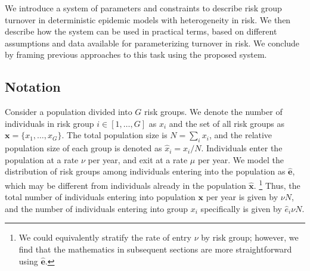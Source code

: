 We introduce a system of parameters and constraints
to describe risk group turnover
in deterministic epidemic models with heterogeneity in risk.
We then describe how the system can be used in practical terms,
based on different assumptions and data available for parameterizing turnover in risk.
We conclude by framing previous approaches to this task using the proposed system.
\subsection{Notation}
\label{aa:notation}
Consider a population divided into $G$ risk groups.
We denote the number of individuals in risk group $i \in [1, \dots, G]$ as $x_i$
and the set of all risk groups as $\bm{x} = \{x_1, \dots, x_G\}$.
The total population size is $N = \sum_i {x_i}$,
and the relative population size of each group
is denoted as $\hat{x}_i = x_i / N$.
Individuals enter the population at a rate $\nu$ per year,
and exit at a rate $\mu$ per year.
We model the distribution of risk groups
among individuals entering into the population as $\bm{\hat{e}}$,
which may be different from individuals already in the population $\bm{\hat{x}}$.%
\footnote{We could equivalently stratify the rate of entry $\nu$ by risk group;
  however, we find that the mathematics in subsequent sections
  are more straightforward using $\bm{\hat{e}}$.}
Thus, the total number of individuals
entering into population $\bm{x}$ per year is given by $\nu N$,
and the number of individuals
entering into group $x_i$ specifically is given by $\hat{e}_i \nu N$.
\par
